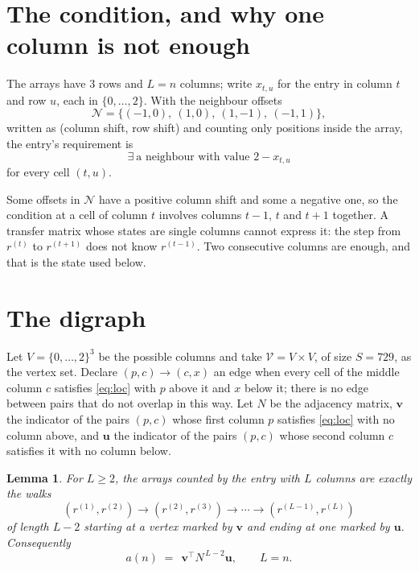 \documentclass[11pt,a4paper]{article}
\theoremstyle{plain}
\newtheorem{lemma}[theorem]{Lemma}
\theoremstyle{definition}
\begin{document}
\section{The condition, and why one column is not enough}

The arrays have $3$ rows and $L=n$ columns; write $x_{t,u}$ for the entry in
column $t$ and row $u$, each in $\{0,\dots,2\}$. With the neighbour offsets
\[
\mathcal N=\{(-1,0),\ (1,0),\ (1,-1),\ (-1,1)\},
\]
written as (column shift, row shift) and counting only positions inside the array, the
entry's requirement is
\begin{equation}\label{eq:loc}
\exists\ \text{a neighbour with value }2-x_{t,u}
\end{equation}
for every cell $(t,u)$.

Some offsets in $\mathcal N$ have a positive column shift and some a negative one, so the
condition at a cell of column $t$ involves columns $t-1$, $t$ and $t+1$ together. A transfer
matrix whose states are single columns cannot express it: the step from $r^{(t)}$ to
$r^{(t+1)}$ does not know $r^{(t-1)}$. Two consecutive columns are enough, and that is
the state used below.

\section{The digraph}

Let $V=\{0,\dots,2\}^{3}$ be the possible columns and take
$\mathcal V=V\times V$, of size $S=729$, as the vertex set. Declare $(p,c)\to(c,x)$ an edge
when every cell of the middle column $c$ satisfies \eqref{eq:loc} with $p$ above it and $x$
below it; there is no edge between pairs that do not overlap in this way. Let $N$ be the
adjacency matrix, $\mathbf{v}$ the indicator of the pairs $(p,c)$ whose first column $p$
satisfies \eqref{eq:loc} with no column above, and $\mathbf{u}$ the indicator of
the pairs $(p,c)$ whose second column $c$ satisfies it with no column below.

\begin{lemma}\label{lem:walk}
For $L\ge2$, the arrays counted by the entry with $L$ columns are exactly the walks
\[
(r^{(1)},r^{(2)})\to(r^{(2)},r^{(3)})\to\cdots\to(r^{(L-1)},r^{(L)})
\]
of length $L-2$ starting at a vertex marked by $\mathbf{v}$ and ending at one marked by
$\mathbf{u}$. Consequently
\[
a(n)\;=\;\,\mathbf{v}^{\!\top}N^{\,L-2}\mathbf{u},\qquad L=n .
\]
\end{lemma}
\end{document}

